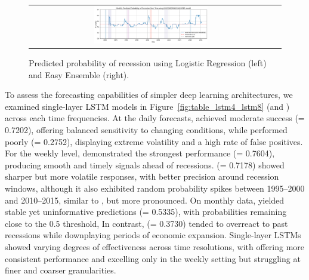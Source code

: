 \begin{figure}[H]
\begin{tabular}{c c}
        \includegraphics[width=0.48\textwidth]{Steps/Plots/Monthly Predicted Probability of Recession Over Time using EASYENSEMBLECLASSIFIER model.png} \\
    \end{tabular}
    \caption{Predicted probability of recession %
    using Logistic Regression (left) and Easy Ensemble (right).}
    \label{fig:table_lr_ee}
\end{figure}

\vspace{-21pt}

To assess the forecasting capabilities of simpler deep learning architectures, we examined single-layer LSTM models in Figure~\ref{fig:table_lstm4_lstm8} (\LSTMF and \LSTME) across each time frequencies. 
At the daily forecasts, \LSTMF achieved moderate success (\AUCone = 0.7202), offering balanced sensitivity to changing conditions, while \LSTME performed poorly (\AUCone = 0.2752), displaying extreme volatility and a high rate of false positives. 
For the weekly level, \LSTME demonstrated the strongest performance (\AUCone = 0.7604), producing smooth and timely signals ahead of recessions. 
\LSTMF (\AUCone = 0.7178) showed sharper but more volatile responses, with better precision around recession windows, although it also exhibited random probability spikes between 1995–2000 and 2010–2015, similar to \LSTME, but more pronounced. 
On monthly data, \LSTMF yielded stable yet uninformative predictions (\AUCone = 0.5335), with probabilities remaining close to the 0.5 threshold, In contrast, \LSTME (\AUCone = 0.3730) tended to overreact to past recessions while downplaying periods of economic expansion.
Single-layer LSTMs showed varying degrees of effectiveness across time resolutions, with \LSTMF offering more consistent performance and \LSTME excelling only in the weekly setting but struggling at finer and coarser granularities.

